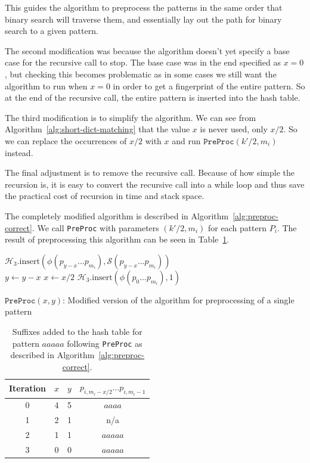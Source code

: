 \documentclass[ %
                    author={Dominic Joseph Moylett},
                    degree={MEng},
                     title={Dictionary Matching with Fingerprints},
                  subtitle={An Empirical Analysis},
                      type={research},
                      year={2015} ]{dissertation}
\begin{document}
This guides the algorithm to preprocess the patterns in the same order that binary search will traverse them, and essentially lay out the path for binary search to a given pattern.

The second modification was because the algorithm doesn't yet specify a base case for the recursive call to stop. The base case was in the end specified as $x = 0$, but checking this becomes problematic as in some cases we still want the algorithm to run when $x = 0$ in order to get a fingerprint of the entire pattern. So at the end of the recursive call, the entire pattern is inserted into the hash table.

The third modification is to simplify the algorithm. We can see from Algorithm~\ref{alg:short-dict-matching} that the value $x$ is never used, only $x/2$. So we can replace the occurrences of $x/2$ with $x$ and run $\texttt{PreProc}(k'/2, m_i)$ instead.

The final adjustment is to remove the recursive call. Because of how simple the recursion is, it is easy to convert the recursive call into a while loop and thus save the practical cost of recursion in time and stack space.

The completely modified algorithm is described in Algorithm~\ref{alg:preproc-correct}. We call \texttt{PreProc} with parameters $(k'/2, m_i)$ for each pattern $P_i$. The result of preprocessing this algorithm can be seen in Table~\ref{tab:preproc-results-correct}.

\begin{algorithm}[t]
 {
   {
    $\mathcal{H}_3.\text{insert}(\phi(p_{y-x}...p_{m_i}), \mathcal{S}(p_{y-x}...p_{m_i}))$\\
    $y \gets y - x$
  }
  $x \gets x/2$
}
$\mathcal{H}_3.\text{insert}(\phi(p_0...p_{m_i}), 1)$
\caption{$\texttt{PreProc}(x,y)$: Modified version of the algorithm for preprocessing of a single pattern}
\label{alg:preproc-correct}
\end{algorithm}

\begin{table}[t]
  \centering
  \begin{tabular}{|c|c|c|c|}
    \hline
    Iteration & $x$ & $y$ & $p_{i, m_i-x/2}...p_{i, m_i - 1}$ \\\hline
    0 & 4 & 5 & $aaaa$ \\\hline
    1 & 2 & 1 & n/a \\\hline
    2 & 1 & 1 & $aaaaa$ \\\hline
    3 & 0 & 0 & $aaaaa$ \\\hline
  \end{tabular}
  \caption{Suffixes added to the hash table for pattern $aaaaa$ following \texttt{PreProc} as described in Algorithm~\ref{alg:preproc-correct}.}
  \label{tab:preproc-results-correct}
\end{table}
\end{document}
